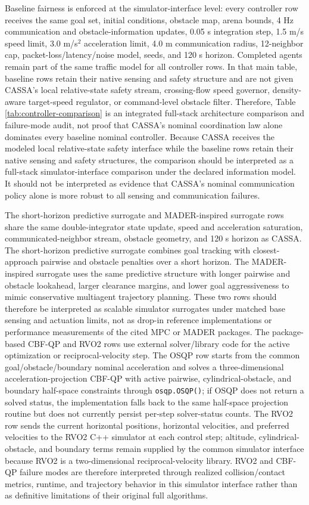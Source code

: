 \documentclass[11pt]{article}
\begin{document}
Baseline fairness is enforced at the simulator-interface level: every controller row receives the same goal set, initial conditions, obstacle map, arena bounds, 4 Hz communication and obstacle-information updates, 0.05 s integration step, 1.5 m/s speed limit, 3.0 m/s$^2$ acceleration limit, 4.0 m communication radius, 12-neighbor cap, packet-loss/latency/noise model, seeds, and 120 s horizon. Completed agents remain part of the same traffic model for all controller rows. In that main table, baseline rows retain their native sensing and safety structure and are not given CASSA's local relative-state safety stream, crossing-flow speed governor, density-aware target-speed regulator, or command-level obstacle filter. Therefore, Table \ref{tab:controller-comparison} is an integrated full-stack architecture comparison and failure-mode audit, not proof that CASSA's nominal coordination law alone dominates every baseline nominal controller. Because CASSA receives the modeled local relative-state safety interface while the baseline rows retain their native sensing and safety structures, the comparison should be interpreted as a full-stack simulator-interface comparison under the declared information model. It should not be interpreted as evidence that CASSA's nominal communication policy alone is more robust to all sensing and communication failures.

The short-horizon predictive surrogate and MADER-inspired surrogate rows share the same double-integrator state update, speed and acceleration saturation, communicated-neighbor stream, obstacle geometry, and 120 s horizon as CASSA. The short-horizon predictive surrogate combines goal tracking with closest-approach pairwise and obstacle penalties over a short horizon. The MADER-inspired surrogate uses the same predictive structure with longer pairwise and obstacle lookahead, larger clearance margins, and lower goal aggressiveness to mimic conservative multiagent trajectory planning. These two rows should therefore be interpreted as scalable simulator surrogates under matched base sensing and actuation limits, not as drop-in reference implementations or performance measurements of the cited MPC or MADER packages. The package-based CBF-QP and RVO2 rows use external solver/library code for the active optimization or reciprocal-velocity step. The OSQP row starts from the common goal/obstacle/boundary nominal acceleration and solves a three-dimensional acceleration-projection CBF-QP with active pairwise, cylindrical-obstacle, and boundary half-space constraints through \texttt{osqp.OSQP()}; if OSQP does not return a solved status, the implementation falls back to the same half-space projection routine but does not currently persist per-step solver-status counts. The RVO2 row sends the current horizontal positions, horizontal velocities, and preferred velocities to the RVO2 C++ simulator at each control step; altitude, cylindrical-obstacle, and boundary terms remain supplied by the common simulator interface because RVO2 is a two-dimensional reciprocal-velocity library. RVO2 and CBF-QP failure modes are therefore interpreted through realized collision/contact metrics, runtime, and trajectory behavior in this simulator interface rather than as definitive limitations of their original full algorithms.
\end{document}
